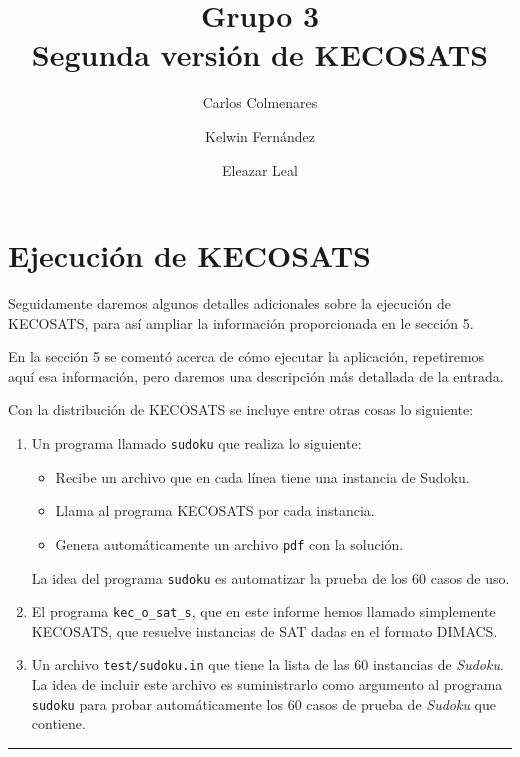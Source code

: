 \documentclass[12pt,lettersize,oneside]{article}
\title{Grupo 3 \\Segunda versión de KECOSATS}
\author{Carlos Colmenares \and Kelwin Fernández \and Eleazar Leal}
\begin{document}
\setlength{\parskip}{2.5mm}
\setlength{\itemsep}{0ex }

\appendix
\section{Ejecución de KECOSATS}

Seguidamente daremos algunos detalles adicionales sobre la ejecución de
KECOSATS, para así ampliar la información proporcionada en le sección 5.

En la sección 5 se comentó acerca de cómo ejecutar la aplicación, repetiremos
aquí esa información, pero daremos una descripción más detallada de la entrada.


Con la distribución de KECOSATS se incluye entre otras cosas lo siguiente: \vspace{-2.5mm}
\begin{enumerate}
\item Un programa llamado {\tt sudoku} que
realiza lo siguiente:\vspace{-2.5mm}
\begin{itemize}
  \item Recibe un archivo que en cada línea tiene una instancia de Sudoku.
  \item Llama al programa KECOSATS por cada instancia.
  \item Genera automáticamente un archivo {\tt pdf} con la solución.
\end{itemize}
La idea del programa {\tt sudoku} es automatizar la prueba de los 60 casos de
uso.

\item El programa {\tt kec\_o\_sat\_s}, que en este informe hemos llamado
  simplemente KECOSATS, que resuelve instancias de SAT dadas en el
  formato DIMACS.

\item Un archivo {\tt test/sudoku.in} que tiene la lista de las 60 instancias de
  \emph{Sudoku}. La idea de incluir este archivo es suministrarlo como argumento
  al programa {\tt sudoku} para probar automáticamente los 60 casos de prueba de
  \emph{Sudoku} que contiene.
\end{enumerate}

\rule{4cm}{0.3mm}
\end{document}
